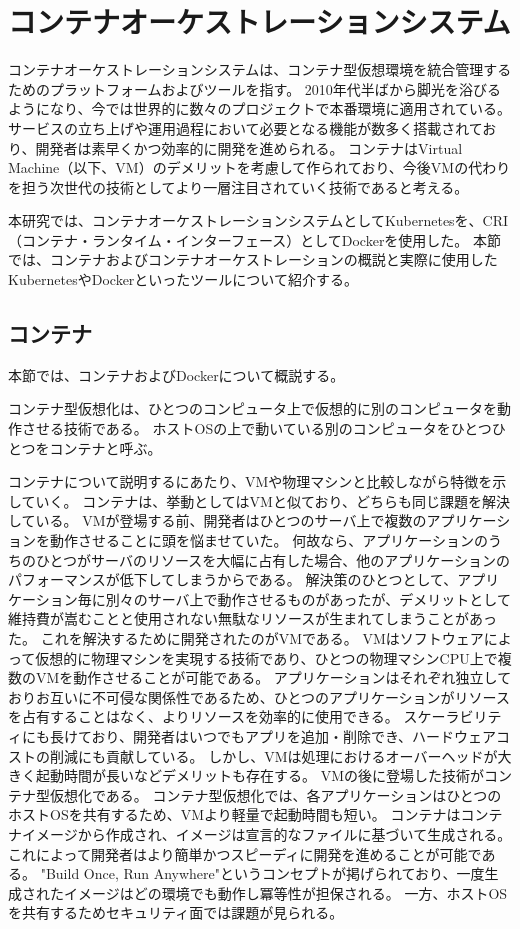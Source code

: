 \section{コンテナオーケストレーションシステム}

コンテナオーケストレーションシステムは、コンテナ型仮想環境を統合管理するためのプラットフォームおよびツールを指す。
2010年代半ばから脚光を浴びるようになり、今では世界的に数々のプロジェクトで本番環境に適用されている。
サービスの立ち上げや運用過程において必要となる機能が数多く搭載されており、開発者は素早くかつ効率的に開発を進められる。
コンテナはVirtual Machine（以下、VM）のデメリットを考慮して作られており、今後VMの代わりを担う次世代の技術としてより一層注目されていく技術であると考える。

本研究では、コンテナオーケストレーションシステムとしてKubernetesを、CRI（コンテナ・ランタイム・インターフェース）としてDockerを使用した。
本節では、コンテナおよびコンテナオーケストレーションの概説と実際に使用したKubernetesやDockerといったツールについて紹介する。

\subsection{コンテナ}

本節では、コンテナおよびDockerについて概説する。

コンテナ型仮想化は、ひとつのコンピュータ上で仮想的に別のコンピュータを動作させる技術である。
ホストOSの上で動いている別のコンピュータをひとつひとつをコンテナと呼ぶ。

コンテナについて説明するにあたり、VMや物理マシンと比較しながら特徴を示していく。
コンテナは、挙動としてはVMと似ており、どちらも同じ課題を解決している。
VMが登場する前、開発者はひとつのサーバ上で複数のアプリケーションを動作させることに頭を悩ませていた。
何故なら、アプリケーションのうちのひとつがサーバのリソースを大幅に占有した場合、他のアプリケーションのパフォーマンスが低下してしまうからである。
解決策のひとつとして、アプリケーション毎に別々のサーバ上で動作させるものがあったが、デメリットとして維持費が嵩むことと使用されない無駄なリソースが生まれてしまうことがあった。
これを解決するために開発されたのがVMである。
VMはソフトウェアによって仮想的に物理マシンを実現する技術であり、ひとつの物理マシンCPU上で複数のVMを動作させることが可能である。
アプリケーションはそれぞれ独立しておりお互いに不可侵な関係性であるため、ひとつのアプリケーションがリソースを占有することはなく、よりリソースを効率的に使用できる。
スケーラビリティにも長けており、開発者はいつでもアプリを追加・削除でき、ハードウェアコストの削減にも貢献している。
しかし、VMは処理におけるオーバーヘッドが大きく起動時間が長いなどデメリットも存在する。
VMの後に登場した技術がコンテナ型仮想化である。
コンテナ型仮想化では、各アプリケーションはひとつのホストOSを共有するため、VMより軽量で起動時間も短い。
コンテナはコンテナイメージから作成され、イメージは宣言的なファイルに基づいて生成される。
これによって開発者はより簡単かつスピーディに開発を進めることが可能である。
"Build Once, Run Anywhere"というコンセプトが掲げられており、一度生成されたイメージはどの環境でも動作し冪等性が担保される。
一方、ホストOSを共有するためセキュリティ面では課題が見られる。

